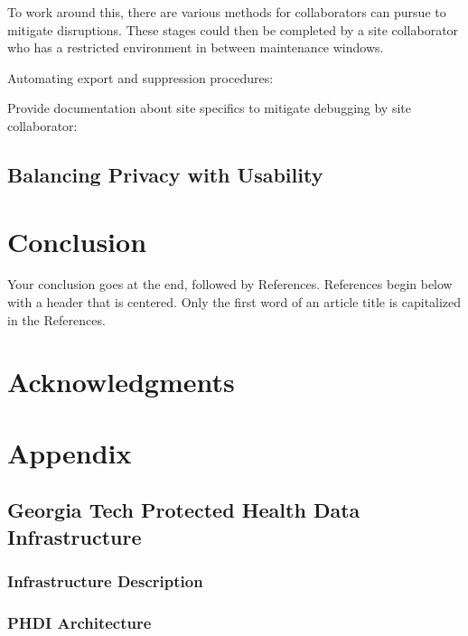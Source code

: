 \documentclass{amia}
\begin{document}
To work around this, there are various methods for collaborators can pursue to mitigate disruptions. These stages could then be completed by a site collaborator who has a restricted environment in between maintenance windows. 

Automating export and suppression procedures:

Provide documentation about site specifics to mitigate debugging by site collaborator:



\subsection{Balancing Privacy with Usability}

\section*{Conclusion}

Your conclusion goes at the end, followed by References.  References begin below with a header that is centered.  Only the first word of an article title is capitalized in the References.

\section*{Acknowledgments}

\makeatletter
\renewcommand{\@biblabel}[1]{\hfill #1.}
\makeatother


  

\section*{Appendix}

\subsection{Georgia Tech Protected Health Data Infrastructure}

\subsubsection{Infrastructure Description}
\subsubsection*{PHDI Architecture}
\end{document}
